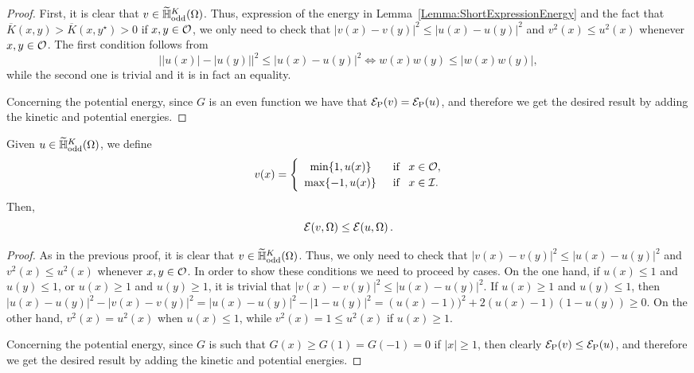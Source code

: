 \begin{proof}
First, it is clear that $v\in \widetilde{\mathbb{H}}^K_{\mathrm{odd}}(\Omega)$. Thus,
expression of the energy in Lemma~\ref{Lemma:ShortExpressionEnergy} and the fact that $\overline{K}(x,y) > \overline{K}(x,y^\star)
> 0$ if $x,y\in \mathcal{O}$, we only need to check that $|v(x)-v(y)|^2\leq |u(x)-u(y)|^2$ and $v^2(x)
\leq u^2(x)$ whenever $x,y\in\mathcal{O}$. The first condition follows from
$$ \big||u(x)|-|u(y)|\big|^2\leq |u(x)-u(y)|^2 \Longleftrightarrow w(x)w(y) \leq |w(x)w(y)|,  $$
while the second one is trivial and it is in fact an equality.

Concerning the potential energy, since $G$ is an even function we have that $\mathcal{E}_\mathrm{P}(v) =
\mathcal{E}_\mathrm{P}(u)$, and therefore we get the desired result by adding the kinetic and potential
energies.
\end{proof}

\begin{lemma}
\label{Lemma:TruncationOfFunctions2DecreaseEnergy} Given $u\in
\widetilde{\mathbb{H}}^K_{\mathrm{odd}}(\Omega)$, we define
\begin{equation*}
v(x) = \begin{cases}
\hspace{3.6mm}\min\{1,u(x)\} \,\,\, &\text{if } \,\,\, x\in\mathcal{O},\\
\,\,\,\max\{-1,u(x)\} \,\,\, &\text{if } \,\,\, x\in\mathcal{I}.
\end{cases}
\end{equation*}
Then,
$$ \mathcal{E}(v,\Omega) \leq \mathcal{E}(u,\Omega)\,.  $$
\end{lemma}

\begin{proof}
As in the previous proof, it is clear that $v\in
\widetilde{\mathbb{H}}^K_{\mathrm{odd}}(\Omega)$. Thus, we only need to check that $|v(x)-v(y)|^2\leq |u(x)-u(y)|^2$ and $v^2(x) \leq u^2(x)$ whenever $x,y\in\mathcal{O}$. In order to show these conditions we need to proceed by cases. On the one hand, if
$u(x)\leq 1$ and $u(y)\leq 1$, or $u(x)\geq 1$ and $u(y)\geq 1$, it is trivial that $|v(x)-v(y)|^2
\leq |u(x)-u(y)|^2$. If $u(x)\geq 1$ and $u(y)\leq 1$, then $ |u(x)-u(y)|^2-|v(x)-v(y)|^2 =
|u(x)-u(y)|^2-|1-u(y)|^2 = (u(x)-1))^2+2(u(x)-1)(1-u(y)) \geq 0$. On the other hand, $v^2(x) =
u^2(x)$ when $u(x)\leq 1$, while $v^2(x) = 1 \leq u^2(x)$ if $u(x)\geq 1$.

Concerning the potential energy, since $G$ is such that $G(x)\geq G(1) = G(-1) = 0$ if $|x|\geq 1$,
then clearly $\mathcal{E}_\mathrm{P}(v) \leq \mathcal{E}_\mathrm{P}(u)$, and therefore we get the desired
result by adding the kinetic and potential energies.
\end{proof}


